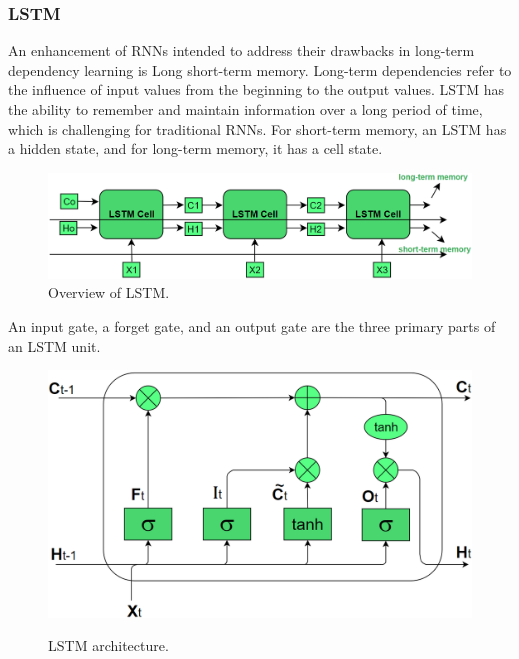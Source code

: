 \documentclass{ieeeojies}
\begin{document}
\subsubsection{LSTM}
An enhancement of RNNs intended to address their drawbacks in long-term dependency learning is Long short-term memory. Long-term dependencies refer to the influence of input values from the beginning to the output values. LSTM has the ability to remember and maintain information over a long period of time, which is challenging for traditional RNNs. For short-term memory, an LSTM has a hidden state, and for long-term memory, it has a cell state. 
\begin{figure}[H]
  \centering
  \begin{minipage}{1\linewidth}
    \centering
    \includegraphics[width=\linewidth]{image/LSTM1.png}
    \caption{Overview of LSTM.}
    \label{fig8}
  \end{minipage}
\end{figure}
\noindent An input gate, a forget gate, and an output gate are the three primary parts of an LSTM unit.
\begin{figure}[H]
  \centering
  \begin{minipage}{0.8\linewidth}
    \centering
    \includegraphics[width=\linewidth]{image/LSTM2.png}
    \label{fig8}
  \end{minipage}
  \caption{ LSTM architecture.}
\end{figure}
\noindent
\end{document}

